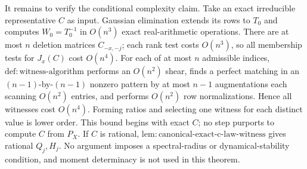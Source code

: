 It remains to verify the conditional complexity claim. Take an exact irreducible representative \(C\) as input. Gaussian elimination extends its rows to \(T_0\) and computes \(W_0=T_0^{-1}\) in \(O(n^3)\) exact real-arithmetic operations. There are at most \(n\) deletion matrices \(C_{-x,-j}\); each rank test costs \(O(n^3)\), so all membership tests for \(J_x(C)\) cost \(O(n^4)\). For each of at most \(n\) admissible indices, \(\mathrm{def:witness\text{-}algorithm}\) performs an \(O(n^2)\) shear, finds a perfect matching in an \((n-1)\)-by-\((n-1)\) nonzero pattern by at most \(n-1\) augmentations each scanning \(O(n^2)\) entries, and performs \(O(n^2)\) row normalizations. Hence all witnesses cost \(O(n^4)\). Forming ratios and selecting one witness for each distinct value is lower order. This bound begins with exact \(C\); no step purports to compute \(C\) from \(P_X\). If \(C\) is rational, \(\mathrm{lem:canonical\text{-}exact\text{-}c\text{-}law\text{-}witness}\) gives rational \(Q_j,H_j\). No argument imposes a spectral-radius or dynamical-stability condition, and moment determinacy is not used in this theorem.